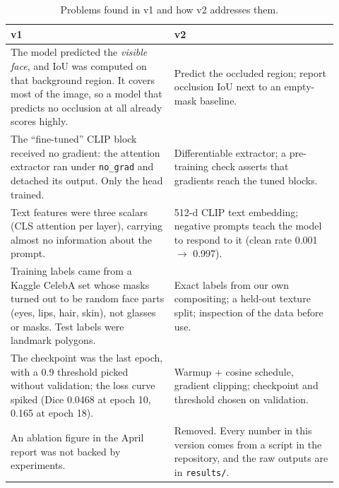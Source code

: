\documentclass[11pt,a4paper]{article}
\begin{document}
\begin{table}[H]
  \centering
  \caption{Problems found in v1 and how v2 addresses them.}
  \label{tab:v1}
  \small
  \begin{tabular}{p{0.46\linewidth}p{0.46\linewidth}}
    \toprule
    v1 & v2 \\
    \midrule
    The model predicted the \emph{visible face}, and IoU was computed on that background region. It
    covers most of the image, so a model that predicts no occlusion at all already scores highly. &
    Predict the occluded region; report occlusion IoU next to an empty-mask baseline. \\
    The ``fine-tuned'' CLIP block received no gradient: the attention extractor ran under
    \texttt{no\_grad} and detached its output. Only the head trained. &
    Differentiable extractor; a pre-training check asserts that gradients reach the tuned blocks. \\
    Text features were three scalars (CLS attention per layer), carrying almost no information about
    the prompt. &
    512-d CLIP text embedding; negative prompts teach the model to respond to it (clean rate 0.001
    $\to$ 0.997). \\
    Training labels came from a Kaggle CelebA set whose masks turned out to be random face parts (eyes,
    lips, hair, skin), not glasses or masks. Test labels were landmark polygons. &
    Exact labels from our own compositing; a held-out texture split; inspection of the data before use. \\
    The checkpoint was the last epoch, with a 0.9 threshold picked without validation; the loss curve
    spiked (Dice 0.0468 at epoch 10, 0.165 at epoch 18). &
    Warmup + cosine schedule, gradient clipping; checkpoint and threshold chosen on validation. \\
    An ablation figure in the April report was not backed by experiments. &
    Removed. Every number in this version comes from a script in the repository, and the raw outputs are in
    \texttt{results/}. \\
    \bottomrule
  \end{tabular}
\end{table}

\end{document}
